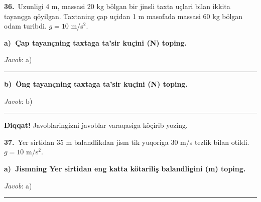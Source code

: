 \documentclass[11pt,a4paper]{article}
\newcommand{\blank}{\rule{5cm}{0.4pt}}
\begin{document}
\noindent{}\par\vspace{14pt}
\noindent\textbf{36.}\ Uzunligi 4 m, massasi 20 kg bölgan bir jinsli taxta uçlari bilan ikkita tayançga qöyilgan. Taxtaning çap uçidan 1 m masofada massasi 60 kg bölgan odam turibdi. $g=10$ m/s$^2$.\par\smallskip
\medskip\noindent\textbf{a)\ Çap tayançning taxtaga ta’sir kuçini (N) toping.}\par
\noindent\textit{Javob}: a)\ \blank\par
\medskip\noindent\textbf{b)\ Öng tayançning taxtaga ta’sir kuçini (N) toping.}\par
\noindent\textit{Javob}: b)\ \blank\par
\medskip\noindent\textbf{Diqqat!} Javoblaringizni javoblar varaqasiga köçirib yozing.\par\vspace{10pt}
\noindent\textbf{37.}\ Yer sirtidan 35 m balandlikdan jism tik yuqoriga 30 m/s tezlik bilan otildi. $g=10$ m/s$^2$.\par\smallskip
\medskip\noindent\textbf{a)\ Jismning Yer sirtidan eng katta kötariliş balandligini (m) toping.}\par
\noindent\textit{Javob}: a)\ \blank\par
\end{document}
